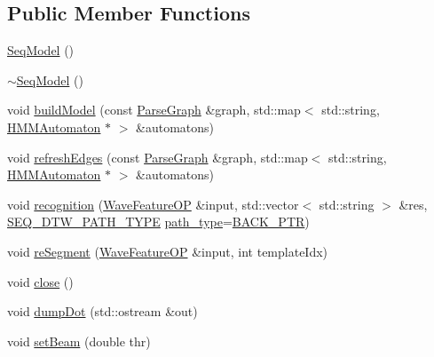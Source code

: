 \subsection*{Public Member Functions}
\begin{DoxyCompactItemize}
\item 
\hyperlink{class_seq_model_aeac29571be1c65086f11a5bea3a517d8}{Seq\+Model} ()
\item 
\hyperlink{class_seq_model_a99bb121085e7008eed41363f83d25118}{$\sim$\+Seq\+Model} ()
\item 
void \hyperlink{class_seq_model_abf7146e3c63cc7087cb4d6cbf92be2b3}{build\+Model} (const \hyperlink{class_parse_graph}{Parse\+Graph} \&graph, std\+::map$<$ std\+::string, \hyperlink{class_h_m_m_automaton}{H\+M\+M\+Automaton} $\ast$ $>$ \&automatons)
\item 
void \hyperlink{class_seq_model_a4bba459d7daff3d098780ac09e4a6a85}{refresh\+Edges} (const \hyperlink{class_parse_graph}{Parse\+Graph} \&graph, std\+::map$<$ std\+::string, \hyperlink{class_h_m_m_automaton}{H\+M\+M\+Automaton} $\ast$ $>$ \&automatons)
\item 
void \hyperlink{class_seq_model_a93b6a99e725800de1714e2501066b116}{recognition} (\hyperlink{class_wave_feature_o_p}{Wave\+Feature\+O\+P} \&input, std\+::vector$<$ std\+::string $>$ \&res, \hyperlink{class_seq_model_a145b769692f03811a15c5289fe77da42}{S\+E\+Q\+\_\+\+D\+T\+W\+\_\+\+P\+A\+T\+H\+\_\+\+T\+Y\+P\+E} \hyperlink{class_seq_model_afa1904812bb4a3363960db559983e195}{path\+\_\+type}=\hyperlink{class_seq_model_a145b769692f03811a15c5289fe77da42a4e15f646c0c498e155c24f183dbfb6fb}{B\+A\+C\+K\+\_\+\+P\+T\+R})
\item 
void \hyperlink{class_seq_model_aa3c44f8d03a4fec7222f878e0dd67ece}{re\+Segment} (\hyperlink{class_wave_feature_o_p}{Wave\+Feature\+O\+P} \&input, int template\+Idx)
\item 
void \hyperlink{class_seq_model_a0ba1f75784a7f949494054cfa929a728}{close} ()
\item 
void \hyperlink{class_seq_model_a06f6db60f7c9e093d75bd633ef4b198f}{dump\+Dot} (std\+::ostream \&out)
\item 
void \hyperlink{class_seq_model_a9d5e640836a004833610f04ef46cddb6}{set\+Beam} (double thr)
\end{DoxyCompactItemize}
